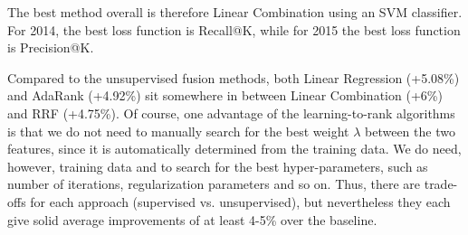 \begin{table}[h!]
\centering
\caption{Comparison between the best fusion methods --- absolute P@10 percent improvements for each of the four query runs
(Summaries 2014, Descriptions 2014, Summaries 2015, Descriptions 2015).}
\label{fusion-comp}
\end{table}

The best method overall is therefore Linear Combination using an SVM classifier. For 2014, the best loss function
is Recall@K, while for 2015 the best loss function is Precision@K.

Compared to the unsupervised fusion methods, both Linear Regression (+5.08\%) and AdaRank (+4.92\%) sit somewhere in between
Linear Combination (+6\%) and RRF (+4.75\%). Of course, one advantage of the learning-to-rank algorithms
is that we do not need to manually search for the best weight $\lambda$ between the two features,
since it is automatically determined
from the training data.
We do need, however, training data and to search for the best hyper-parameters, such as number of iterations, regularization
parameters and so on. Thus, there are trade-offs for each approach (supervised vs. unsupervised),
but nevertheless they each give solid average improvements of at least 4-5\% over the baseline.

